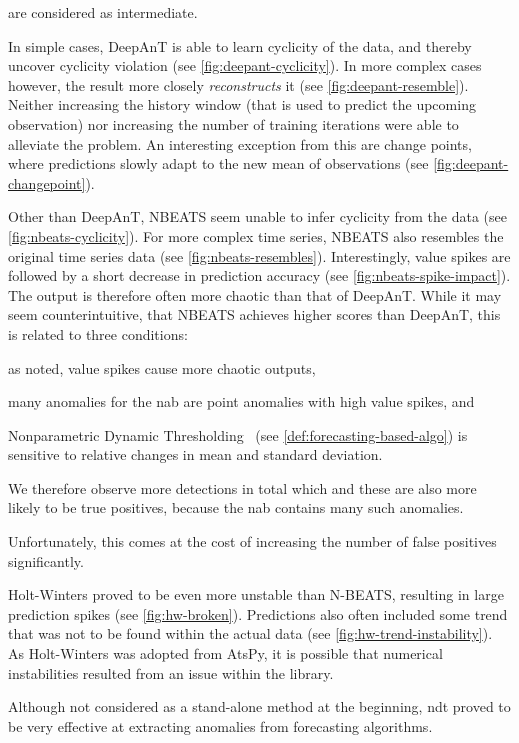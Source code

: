 are considered as intermediate.
\begin{description}[style=unboxed,leftmargin=0cm]
    \item[DeepAnT] In simple cases, DeepAnT is able to learn cyclicity of the data,
    and thereby uncover cyclicity violation (see \cref{fig:deepant-cyclicity}). In more complex cases however, the
    result more closely \textit{reconstructs} it (see \cref{fig:deepant-resemble}).
    Neither increasing the history window (that is used to predict the upcoming
    observation) nor increasing the number of training iterations were able to
    alleviate the problem. An interesting exception from this are change points,
    where predictions slowly adapt to the new mean of observations (see 
    \cref{fig:deepant-changepoint}).
    \item[NBEATS] Other than DeepAnT, NBEATS seem unable to infer cyclicity from
    the data (see \cref{fig:nbeats-cyclicity}). For more complex time series,
    NBEATS also resembles the original time series data (see \cref{fig:nbeats-resembles}).
    Interestingly, value spikes are followed by a short decrease in prediction
    accuracy (see \cref{fig:nbeats-spike-impact}). The output is therefore often
    more chaotic than that of DeepAnT. While it may seem counterintuitive, that
    NBEATS achieves higher scores than DeepAnT, this is related to three conditions:
    \begin{enumerate*}[a.)]
        \item as noted, value spikes cause more chaotic outputs,
        \item many anomalies for the \gls{nab} are point anomalies with high value spikes, and
        \item Nonparametric Dynamic Thresholding~\cite[cf.][]{Hundman.2018}
        (see \cref{def:forecasting-based-algo}) is sensitive to relative changes
        in mean and standard deviation.
    \end{enumerate*}
    
    We therefore observe more detections in total which and these are also more
    likely to be true positives, because the \gls{nab} contains many such anomalies.

    Unfortunately, this comes at the cost of increasing the number of false positives
    significantly.
    \item[Holt-Winters] Holt-Winters proved to be even more unstable than N-BEATS,
    resulting in large prediction spikes (see \cref{fig:hw-broken}). Predictions also
    often included some trend that was not to be found within the actual data (see
    \cref{fig:hw-trend-instability}). As Holt-Winters was adopted from AtsPy,
    it is possible that numerical instabilities resulted from an issue within the library.
    \item[Nonparametric Dynamic Thresholding~\cite{Hundman.2018}] Although not
    considered as a stand-alone method at the beginning, \gls{ndt} proved to be
    very effective at extracting anomalies from forecasting algorithms.
    

\end{description}
